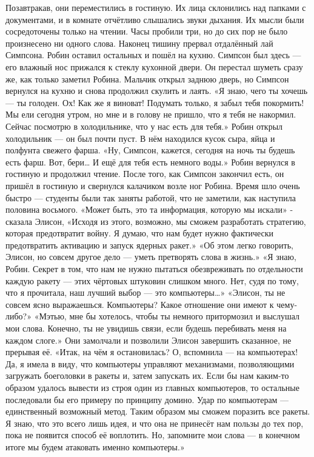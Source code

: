 \documentclass[a4paper,12pt]{book}
\begin{document}
	Позавтракав, они переместились в гостиную. Их лица склонились над папками с документами, и в комнате отчётливо слышались звуки дыхания. Их мысли были сосредоточены только на чтении.
	Часы пробили три, но до сих пор не было произнесено ни одного слова. Наконец тишину прервал отдалённый лай Симпсона. Робин оставил остальных и пошёл на кухню.
	Симпсон был здесь — его влажный нос прижался к стеклу кухонной двери. Он перестал шуметь сразу же, как только заметил Робина. Мальчик открыл заднюю дверь, но Симпсон вернулся на кухню и снова продолжил скулить и лаять.
	«Я знаю, чего ты хочешь — ты голоден. Ох! Как же я виноват! Подумать только, я забыл тебя покормить! Мы ели сегодня утром, но мне и в голову не пришло, что я тебя не накормил. Сейчас посмотрю в холодильнике, что у нас есть для тебя.»
	Робин открыл холодильник — он был почти пуст. В нём находился кусок сыра, яйца и полфунта свежего фарша.
	«Ну, Симпсон, кажется, сегодня на ночь ты будешь есть фарш. Вот, бери… И ещё для тебя есть немного воды.»
	Робин вернулся в гостиную и продолжил чтение. После того, как Симпсон закончил есть, он пришёл в гостиную и свернулся калачиком возле ног Робина. Время шло очень быстро — студенты были так заняты работой, что не заметили, как наступила половина восьмого.
	«Может быть, это та информация, которую мы искали» - сказала Элисон,
	«Исходя из этого, возможно, мы сможем разработать стратегию, которая предотвратит войну. Я думаю, что нам будет нужно фактически предотвратить активацию и запуск ядерных ракет.»
	«Об этом легко говорить, Элисон, но совсем другое дело — уметь претворять слова в жизнь.»
	«Я знаю, Робин. Секрет в том, что нам не нужно пытаться обезвреживать по отдельности каждую ракету — этих чёртовых штуковин слишком много. Нет, судя по тому, что я прочитала, наш лучший выбор — это компьютеры…»
	«Элисон, ты не совсем ясно выражаешься. Компьютеры? Какое отношение они имеют к чему-либо?»
	«Мэтью, мне бы хотелось, чтобы ты немного притормозил и выслушал мои слова. Конечно, ты не увидишь связи, если будешь перебивать меня на каждом слоге.»
	Они замолчали и позволили Элисон завершить сказанное, не прерывая её.
	«Итак, на чём я остановилась? О, вспомнила — на компьютерах! Да, я имела в виду, что компьютеры управляют механизмами, позволяющими загружать боеголовки в ракеты и, затем запускать их. Если бы нам каким-то образом удалось вывести из строя один из главных компьютеров, то остальные последовали бы его примеру по принципу домино. Удар по компьютерам — единственный возможный метод. Таким образом мы сможем поразить все ракеты. Я знаю, что это всего лишь идея, и что она не принесёт нам пользы до тех пор, пока не появится способ её воплотить. Но, запомните мои слова — в конечном итоге мы будем атаковать именно компьютеры.»
\end{document}
